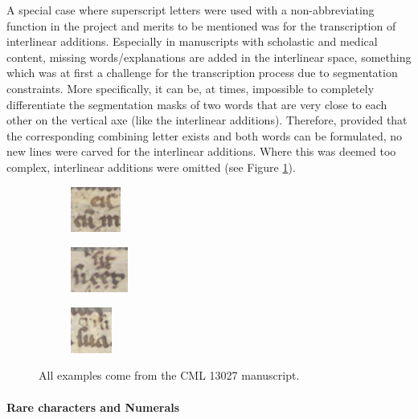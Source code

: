 \documentclass{article}
\begin{document}
A special case where superscript letters were used with a non-abbreviating function in the project and merits to be mentioned was for the transcription of interlinear additions. Especially in manuscripts with scholastic and medical content, missing words/explanations are added in the interlinear space, something which was at first a challenge for the transcription process due to segmentation constraints. More specifically, it can be, at times, impossible to completely differentiate the segmentation masks of two words that are very close to each other on the vertical axe (like the interlinear additions). Therefore, provided that the corresponding combining letter exists and both words can be formulated, no new lines were carved for the interlinear additions. Where this was deemed too complex, interlinear additions were omitted (see Figure \ref{interlinear}).

\begin{figure}[H]
    \centering
    \begin{subfigure}{0.20\linewidth}
    \centering
    \includegraphics[height=1.5cm]{datapaper/images/examples/superscripts/CML13027_bis.png}
    \end{subfigure}
    \begin{subfigure}{0.20\linewidth}
    \centering
    \includegraphics[height=1.5cm]{datapaper/images/examples/superscripts/CML13027_corr.png}
    \end{subfigure}
        \begin{subfigure}{0.20\linewidth}
    \centering
    \includegraphics[height=1.5cm]{datapaper/images/examples/superscripts/CML13027_crisis.png}
    \end{subfigure}
    \caption{All examples come from the CML 13027 manuscript.}
    \label{interlinear}
\end{figure}

\paragraph{Rare characters and Numerals}
\label{special_chars}
\end{document}
